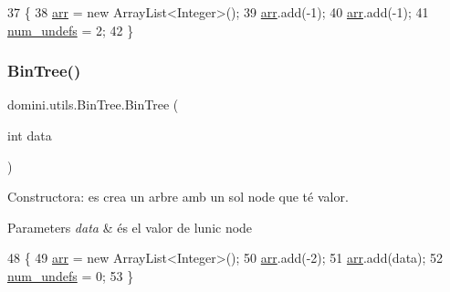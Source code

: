 \begin{DoxyCode}
37                      \{
38         \hyperlink{classdomini_1_1utils_1_1BinTree_a357bcbcf07ba7fcb99d11b237d189e65}{arr} = \textcolor{keyword}{new} ArrayList<Integer>();
39         \hyperlink{classdomini_1_1utils_1_1BinTree_a357bcbcf07ba7fcb99d11b237d189e65}{arr}.add(-1);
40         \hyperlink{classdomini_1_1utils_1_1BinTree_a357bcbcf07ba7fcb99d11b237d189e65}{arr}.add(-1);
41         \hyperlink{classdomini_1_1utils_1_1BinTree_a36f1212262c353accbc0a0385fa45a8d}{num\_undefs} = 2;
42     \}
\end{DoxyCode}
\mbox{\label{classdomini_1_1utils_1_1BinTree_a83904c6ebf931ba29a134be5f29a66c7}} 
\subsubsection{\texorpdfstring{Bin\+Tree()}{BinTree()}\hspace{0.1cm}{\footnotesize\ttfamily [2/3]}}
{\footnotesize\ttfamily domini.\+utils.\+Bin\+Tree.\+Bin\+Tree (\begin{DoxyParamCaption}\item[{int}]{data }\end{DoxyParamCaption})\hspace{0.3cm}{\ttfamily [inline]}}



Constructora\+: es crea un arbre amb un sol node que té valor. 


\begin{DoxyParams}{Parameters}
{\em data} & és el valor de l\textquotesingle{}unic node \\
\hline
\end{DoxyParams}

\begin{DoxyCode}
48                              \{
49         \hyperlink{classdomini_1_1utils_1_1BinTree_a357bcbcf07ba7fcb99d11b237d189e65}{arr} = \textcolor{keyword}{new} ArrayList<Integer>();
50         \hyperlink{classdomini_1_1utils_1_1BinTree_a357bcbcf07ba7fcb99d11b237d189e65}{arr}.add(-2);
51         \hyperlink{classdomini_1_1utils_1_1BinTree_a357bcbcf07ba7fcb99d11b237d189e65}{arr}.add(data);
52         \hyperlink{classdomini_1_1utils_1_1BinTree_a36f1212262c353accbc0a0385fa45a8d}{num\_undefs} = 0;
53     \}
\end{DoxyCode}
\mbox{\label{classdomini_1_1utils_1_1BinTree_a27e66345747234352bf37b604519001a}} 
